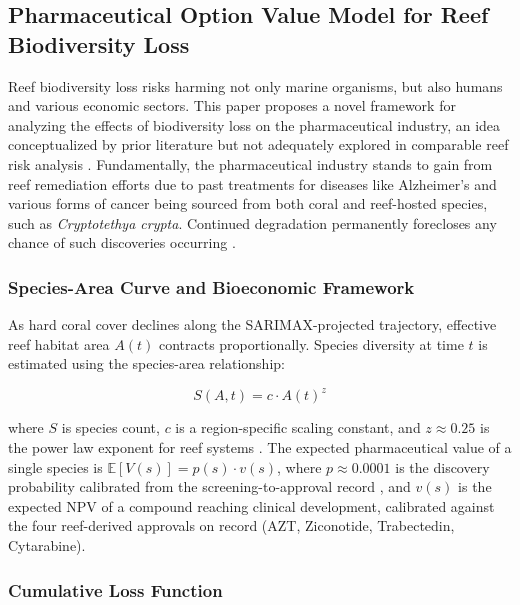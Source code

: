 \documentclass[10pt,letterpaper]{article}
\begin{document}
\subsection{Pharmaceutical Option Value Model for Reef Biodiversity Loss}

Reef biodiversity loss risks harming not only marine organisms, but also humans and various economic sectors. This paper proposes a novel framework for analyzing the effects of biodiversity loss on the pharmaceutical industry, an idea conceptualized by prior literature but not adequately explored in comparable reef risk analysis \cite{simpson1996, costello2006}. Fundamentally, the pharmaceutical industry stands to gain from reef remediation efforts due to past treatments for diseases like Alzheimer's and various forms of cancer being sourced from both coral and reef-hosted species, such as \textit{Cryptotethya crypta}. Continued degradation permanently forecloses any chance of such discoveries occurring \cite{newman2016}.

\subsubsection{Species-Area Curve and Bioeconomic Framework}

As hard coral cover declines along the SARIMAX-projected trajectory, effective reef habitat area $A(t)$ contracts proportionally. Species diversity at time $t$ is estimated using the species-area relationship:

\begin{equation}
S(A,t) = c \cdot A(t)^{z}
\end{equation}

\noindent where $S$ is species count, $c$ is a region-specific scaling constant, and $z \approx 0.25$ is the power law exponent for reef systems \cite{macarthur1967}. The expected pharmaceutical value of a single species is $\mathbb{E}[V(s)] = p(s) \cdot v(s)$, where $p \approx 0.0001$ is the discovery probability calibrated from the screening-to-approval record \cite{simpson1996, costello2006, newman2016}, and $v(s)$ is the expected NPV of a compound reaching clinical development, calibrated against the four reef-derived approvals on record (AZT, Ziconotide, Trabectedin, Cytarabine).

\subsubsection{Cumulative Loss Function}
\end{document}
